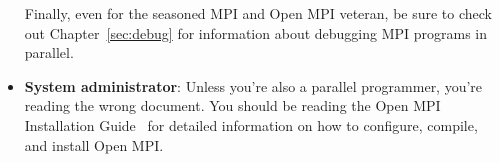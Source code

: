 \begin{itemize}
  Finally, even for the seasoned MPI and Open MPI veteran, be sure to
  check out Chapter~\ref{sec:debug} for information about debugging
  MPI programs in parallel.
  
  \vspace{-3pt}

\item {\bf System administrator}: Unless you're also a parallel
  programmer, you're reading the wrong document.  You should be
  reading the Open MPI Installation
  Guide~\cite{open_mpi_install_guide} for detailed
  information on how to configure, compile, and install Open MPI.
\end{itemize}

